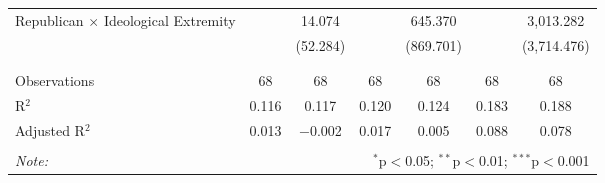 \begin{tabular}{@{\extracolsep{5pt}}lcccccc}
 Republican $\times$ Ideological Extremity &  & 14.074 &  & 645.370 &  & 3,013.282 \\ 
  &  & (52.284) &  & (869.701) &  & (3,714.476) \\ 
  & & & & & & \\ 
\hline \\[-1.8ex] 
Observations & 68 & 68 & 68 & 68 & 68 & 68 \\ 
R$^{2}$ & 0.116 & 0.117 & 0.120 & 0.124 & 0.183 & 0.188 \\ 
Adjusted R$^{2}$ & 0.013 & $-$0.002 & 0.017 & 0.005 & 0.088 & 0.078 \\ 
\hline 
\hline \\[-1.8ex] 
\textit{Note:}  & \multicolumn{6}{r}{$^{*}$p$<$0.05; $^{**}$p$<$0.01; $^{***}$p$<$0.001} \\ 
\end{tabular} 

